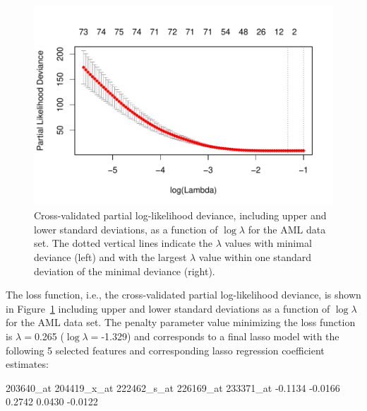 \documentclass[]{jss}
\begin{document}
\begin{figure}[H]
\begin{center}
\begin{Schunk}
\end{Schunk}
\includegraphics{c060_vignette-glmnet}
\end{center}
\caption{Cross-validated partial log-likelihood deviance, including upper and lower standard deviations, as a function of $\log{\lambda}$ for the AML data set. The dotted vertical lines indicate the $\lambda$ values with minimal deviance (left) and with the largest $\lambda$ value within one standard deviation of the minimal deviance (right).}
\label{fig:cvlasso}
\end{figure}

The loss function, i.e., the cross-validated partial log-likelihood deviance, is shown in Figure~\ref{fig:cvlasso} including upper and lower standard deviations as a function of $\log{\lambda}$ for the AML data set. The penalty parameter value minimizing the loss function is $\lambda =$0.265 ($\log\lambda =$-1.329) and corresponds to a final lasso model with the following 5 selected features and corresponding lasso regression coefficient estimates:
\begin{Schunk}
\begin{Soutput}
  203640_at 204419_x_at 222462_s_at   226169_at   233371_at 
    -0.1134     -0.0166      0.2742      0.0430     -0.0122 
\end{Soutput}
\end{Schunk}
\end{document}
